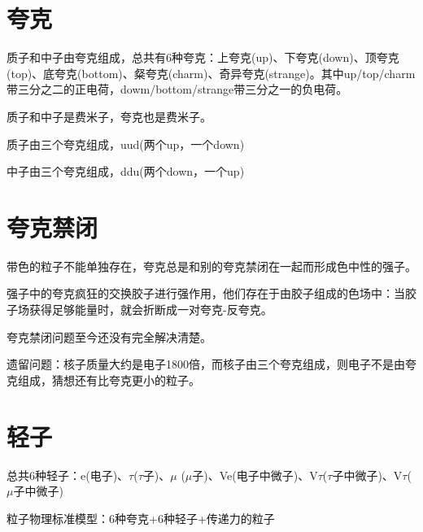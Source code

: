 \section{夸克}

质子和中子由夸克组成，总共有6种夸克：上夸克(up)、下夸克(down)、顶夸克(top)、底夸克(bottom)、粲夸克(charm)、奇异夸克(strange)。其中up/top/charm带三分之二的正电荷，dowm/bottom/strange带三分之一的负电荷。

质子和中子是费米子，夸克也是费米子。

质子由三个夸克组成，uud(两个up，一个down)

中子由三个夸克组成，ddu(两个down，一个up)

\section{夸克禁闭}

带色的粒子不能单独存在，夸克总是和别的夸克禁闭在一起而形成色中性的强子。

强子中的夸克疯狂的交换胶子进行强作用，他们存在于由胶子组成的色场中：当胶子场获得足够能量时，就会折断成一对夸克-反夸克。

夸克禁闭问题至今还没有完全解决清楚。

遗留问题：核子质量大约是电子1800倍，而核子由三个夸克组成，则电子不是由夸克组成，猜想还有比夸克更小的粒子。

\section{轻子}

总共6种轻子：e(电子)、$\tau$($\tau$子)、$\mu$ ($\mu$子)、Ve(电子中微子)、V$\tau$($\tau$子中微子)、V$\tau$($\mu$子中微子)

粒子物理标准模型：6种夸克+6种轻子+传递力的粒子

\clearpage
